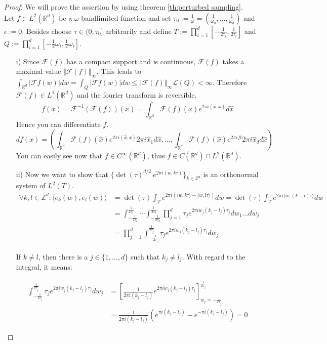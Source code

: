 \documentclass[a4paper, 11pt]{scrreprt}
\newcommand{\RR}{\mathbb{R}}
\newcommand{\ZZ}{\mathbb{Z}}
\newcommand{\FF}{\mathcal{F}}
\newcommand{\student}[1]{\marginnote{{\normalfont\bf #1}}}
\begin{document}
\begin{proof}[Proof]
We will prove the assertion by using theorem \ref{th:perturbed sampling}.\\ Let $f \in L^2(\RR^d)$ be a $\omega$-bandlimited function and set $\tau_0 := \frac{1}{\omega} = \left(\frac{1}{\omega_0}, \ldots, \frac{1}{\omega_d}\right)$ and $\epsilon := 0$. Besides choose $\tau \in (0,\tau_0]$ arbitrarily and define $T := \prod_{i=1}^d \left[-\frac{1}{2\tau_i} ,\frac{1}{2\tau_i}\right]$ and $Q := \prod_{i=1}^d \left[-\frac{1}{2}\omega_i ,\frac{1}{2}\omega_i\right]$.
\begin{itemize}
\item[i)] Since \(\FF(f)\) has a compact support and is continuous, $\FF(f)$ takes a maximal value $\Vert \FF(f) \Vert_\infty$. This leads to $\int_{\RR^d}| \FF f(w)|dw = \int_Q| \FF f(w)| dw \leq \Vert \FF(f) \Vert_\infty \mathscr{L}(Q) < \infty$. Therefore $\FF(f) \in L^1(\RR^d)$ and the fourier transform is reversible.
	 \[f(x) = \FF^{-1}(\FF(f))(x) = \int_{\RR^d}\FF(f)(\hat{x}) e^{2 \pi i (\hat{x},x)} d\hat{x}\]
	 Hence you can differentiate $f$.
	 \[df(x) = \left(\int_{\RR^d} \FF(f)(\hat{x}) e^{2 \pi i (\hat{x},x)} 2 \pi i \hat{x}_1 d\hat{x}, \ldots, \int_{\RR^d} \FF(f)(\hat{x}) e^{2 \pi i f t} 2 \pi i \hat{x}_d d\hat{x} \right)\]
	 You can easily see now that \(f \in C^\infty(\RR^d)\), thus $f \in C(\RR^d) \cap L^2(\RR^d)$.
	 \student{Dominik}
\item[ii)] Now we want to show that $\{\det(\tau)^{d/2}\ e^{2 \pi i (w,k \tau)}\}_{k \in \ZZ^d}$ is an orthonormal system of $L^2(T)$.
\begin{align*}
\forall k,l \in \ZZ^d: \langle e_k(w), e_l(w) \rangle 
&= \det(\tau) \int_{T} e^{2 \pi i (\langle w,k \tau \rangle- \langle w,l \tau \rangle )}dw
= \det(\tau) \int_{T} e^{2 \pi i \langle w,(k-l) \tau \rangle}dw \\
&= \int_{-\frac{1}{2\tau_1}}^{\frac{1}{2\tau_1}} \cdots \int_{-\frac{1}{2\tau_d}}^{\frac{1}{2\tau_d}} \prod_{j=1}^d \tau_j e^{2 \pi i w_j (k_j-l_j) \tau_j}dw_1 \ldots dw_j \\
&= \prod_{j=1}^d \int_{-\frac{1}{2\tau_j}}^{\frac{1}{2\tau_j}} \tau_j e^{2 \pi i w_j (k_j-l_j) \tau_j}dw_j
\end{align*}

If $k \neq l$, then there is a $j \in \{1,\ldots,d\}$ such that $k_j \neq l_j$. With regard to the integral, it means:

\begin{align*}
\int_{-\frac{1}{2\tau_j}}^{\frac{1}{2\tau_j}} \tau_j e^{2 \pi i w_j (k_j-l_j) \tau_j}dw_j
&= \left[ \frac{1}{2 \pi i (k_j - l_j)} e^{2 \pi i w_j (k_j-l_j) \tau_j} \right]_{w_j = -\frac{1}{2 \tau_j}}^{\frac{1}{2 \tau_j}} \\
&= \frac{1}{2 \pi i (k_j-l_j)} \left( e^{\pi i (k_j-l_j)} - e^{-\pi i (k_j-l_j)} \right) = 0
\end{align*}


\end{itemize}
\end{proof}
\end{document}
